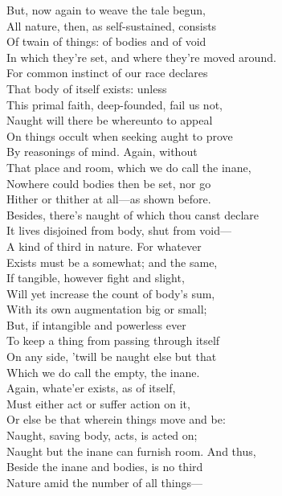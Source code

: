 But, now again to weave the tale begun,\\
All nature, then, as self-sustained, consists\\
Of twain of things: of bodies and of void\\
In which they're set, and where they're moved around.\\
For common instinct of our race declares\\
That body of itself exists: unless\\
This primal faith, deep-founded, fail us not,\\
Naught will there be whereunto to appeal\\
On things occult when seeking aught to prove\\
By reasonings of mind. Again, without\\
That place and room, which we do call the inane,\\
Nowhere could bodies then be set, nor go\\
Hither or thither at all—as shown before.\\
Besides, there's naught of which thou canst declare\\
It lives disjoined from body, shut from void—\\
A kind of third in nature. For whatever\\
Exists must be a somewhat; and the same,\\
If tangible, however fight and slight,\\
Will yet increase the count of body's sum,\\
With its own augmentation big or small;\\
But, if intangible and powerless ever\\
To keep a thing from passing through itself\\
On any side, 'twill be naught else but that\\
Which we do call the empty, the inane.\\
Again, whate'er exists, as of itself,\\
Must either act or suffer action on it,\\
Or else be that wherein things move and be:\\
Naught, saving body, acts, is acted on;\\
Naught but the inane can furnish room. And thus,\\
Beside the inane and bodies, is no third\\
Nature amid the number of all things—\\
